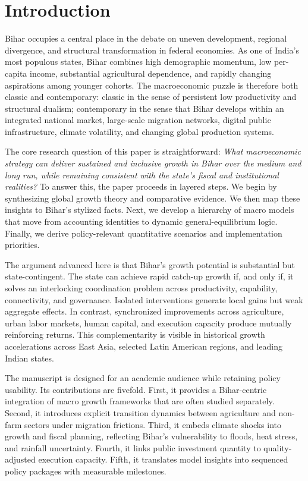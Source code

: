 \documentclass[preprint,12pt]{elsarticle}
\begin{document}
\section{Introduction}
Bihar occupies a central place in the debate on uneven development, regional divergence, and structural transformation in federal economies. As one of India's most populous states, Bihar combines high demographic momentum, low per-capita income, substantial agricultural dependence, and rapidly changing aspirations among younger cohorts. The macroeconomic puzzle is therefore both classic and contemporary: classic in the sense of persistent low productivity and structural dualism; contemporary in the sense that Bihar develops within an integrated national market, large-scale migration networks, digital public infrastructure, climate volatility, and changing global production systems.

The core research question of this paper is straightforward: \emph{What macroeconomic strategy can deliver sustained and inclusive growth in Bihar over the medium and long run, while remaining consistent with the state's fiscal and institutional realities?} To answer this, the paper proceeds in layered steps. We begin by synthesizing global growth theory and comparative evidence. We then map these insights to Bihar's stylized facts. Next, we develop a hierarchy of macro models that move from accounting identities to dynamic general-equilibrium logic. Finally, we derive policy-relevant quantitative scenarios and implementation priorities.

The argument advanced here is that Bihar's growth potential is substantial but state-contingent. The state can achieve rapid catch-up growth if, and only if, it solves an interlocking coordination problem across productivity, capability, connectivity, and governance. Isolated interventions generate local gains but weak aggregate effects. In contrast, synchronized improvements across agriculture, urban labor markets, human capital, and execution capacity produce mutually reinforcing returns. This complementarity is visible in historical growth accelerations across East Asia, selected Latin American regions, and leading Indian states.

The manuscript is designed for an academic audience while retaining policy usability. Its contributions are fivefold. First, it provides a Bihar-centric integration of macro growth frameworks that are often studied separately. Second, it introduces explicit transition dynamics between agriculture and non-farm sectors under migration frictions. Third, it embeds climate shocks into growth and fiscal planning, reflecting Bihar's vulnerability to floods, heat stress, and rainfall uncertainty. Fourth, it links public investment quantity to quality-adjusted execution capacity. Fifth, it translates model insights into sequenced policy packages with measurable milestones.
\end{document}
